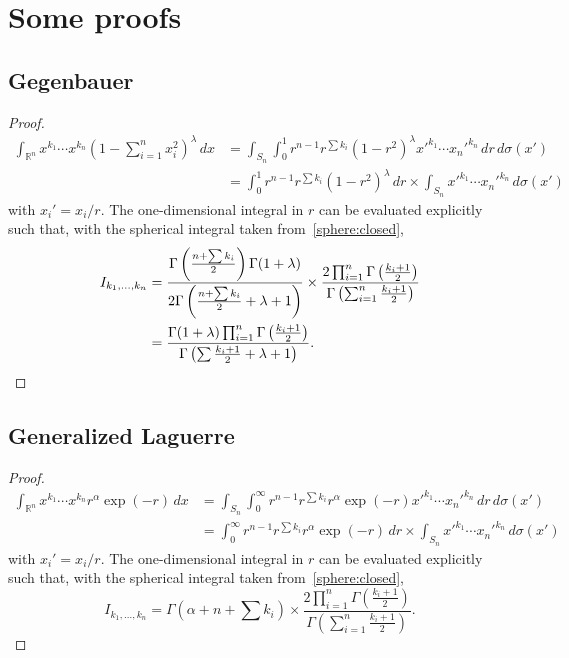 \documentclass[draft]{scrartcl}
\begin{document}
\appendix

\section{Some proofs}

\subsection{Gegenbauer}\label{gegenbauer:proof}
\begin{proof}
\[
\begin{split}
\int_{\mathbb{R}^n}  x^{k_1}\cdots x^{k_n} \left(1 - \sum_{i=1}^n x_i^2\right)^\lambda \,dx
&= \int_{S_n}\int_0^1 r^{n-1} r^{\sum{k_i}} (1-r^2)^\lambda x'^{k_1}\cdots x_n'^{k_n} \,dr\,d\sigma(x')\\
&= \int_0^1 r^{n-1} r^{\sum{k_i}} (1-r^2)^\lambda\,dr \times \int_{S_n} x'^{k_1}\cdots x_n'^{k_n} \,d\sigma(x')
\end{split}
\]
with $x_i' = x_i / r$. The one-dimensional integral in $r$ can be evaluated explicitly
  such that, with the spherical integral taken from~\eqref{sphere:closed},
\[
\begin{split}
I_{k_1,\dots,k_n}
&= \frac{\Gamma\left(\frac{n + \sum k_i}{2}\right)\Gamma(1+\lambda)}{2\Gamma\left(\frac{n+\sum k_i}{2} + \lambda + 1\right)}
\times
 \frac{2\prod_{i=1}^n\Gamma\left(\frac{k_i+1}{2}\right)}{\Gamma\left(\sum_{i=1}^n\frac{k_i+1}{2}\right)}\\
  &= \frac{%
  \Gamma(1+\lambda)\prod_{i=1}^n\Gamma\left(\frac{k_i+1}{2}\right)
}{%
\Gamma\left(\sum\frac{k_i+1}{2} + \lambda + 1\right)
}.
\end{split}
\]
\end{proof}

\subsection{Generalized Laguerre}\label{laguerre:proof}
\begin{proof}
\[
\begin{split}
  \int_{\mathbb{R}^n}  x^{k_1}\cdots x^{k_n} r^\alpha \exp(-r) \,dx
  &= \int_{S_n}\int_0^\infty r^{n-1} r^{\sum{k_i}} r^\alpha \exp(-r) x'^{k_1}\cdots x_n'^{k_n} \,dr\,d\sigma(x')\\
  &= \int_0^\infty r^{n-1} r^{\sum{k_i}} r^\alpha \exp(-r)\,dr \times \int_{S_n} x'^{k_1}\cdots x_n'^{k_n} \,d\sigma(x')
\end{split}
\]
with $x_i' = x_i / r$. The one-dimensional integral in $r$ can be evaluated explicitly
  such that, with the spherical integral taken from~\eqref{sphere:closed},
\[
I_{k_1,\dots,k_n}
  = \Gamma\left(\alpha + n + \sum k_i\right) \times
 \frac{2\prod_{i=1}^n\Gamma\left(\frac{k_i+1}{2}\right)}{\Gamma\left(\sum_{i=1}^n\frac{k_i+1}{2}\right)}.
\]
\end{proof}

{}

\end{document}

